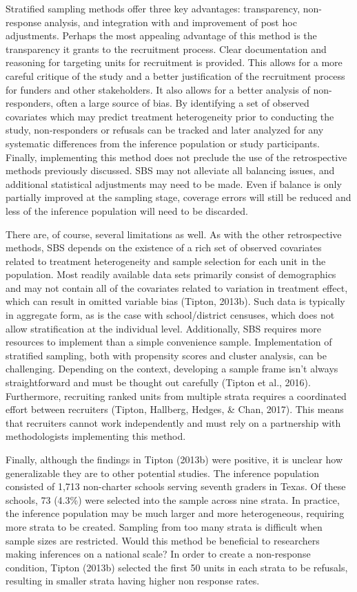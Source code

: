 \documentclass[man,floatsintext]{apa6}
\begin{document}
Stratified sampling methods offer three key advantages: transparency, non-response analysis, and integration with and improvement of post hoc adjustments. Perhaps the most appealing advantage of this method is the transparency it grants to the recruitment process. Clear documentation and reasoning for targeting units for recruitment is provided. This allows for a more careful critique of the study and a better justification of the recruitment process for funders and other stakeholders. It also allows for a better analysis of non-responders, often a large source of bias. By identifying a set of observed covariates which may predict treatment heterogeneity prior to conducting the study, non-responders or refusals can be tracked and later analyzed for any systematic differences from the inference population or study participants. Finally, implementing this method does not preclude the use of the retrospective methods previously discussed. SBS may not alleviate all balancing issues, and additional statistical adjustments may need to be made. Even if balance is only partially improved at the sampling stage, coverage errors will still be reduced and less of the inference population will need to be discarded.

There are, of course, several limitations as well. As with the other retrospective methods, SBS depends on the existence of a rich set of observed covariates related to treatment heterogeneity and sample selection for each unit in the population. Most readily available data sets primarily consist of demographics and may not contain all of the covariates related to variation in treatment effect, which can result in omitted variable bias (Tipton, 2013b). Such data is typically in aggregate form, as is the case with school/district censuses, which does not allow stratification at the individual level. Additionally, SBS requires more resources to implement than a simple convenience sample. Implementation of stratified sampling, both with propensity scores and cluster analysis, can be challenging. Depending on the context, developing a sample frame isn't always straightforward and must be thought out carefully (Tipton et al., 2016). Furthermore, recruiting ranked units from multiple strata requires a coordinated effort between recruiters (Tipton, Hallberg, Hedges, \& Chan, 2017). This means that recruiters cannot work independently and must rely on a partnership with methodologists implementing this method.

Finally, although the findings in Tipton (2013b) were positive, it is unclear how generalizable they are to other potential studies. The inference population consisted of 1,713 non-charter schools serving seventh graders in Texas. Of these schools, 73 (4.3\%) were selected into the sample across nine strata. In practice, the inference population may be much larger and more heterogeneous, requiring more strata to be created. Sampling from too many strata is difficult when sample sizes are restricted. Would this method be beneficial to researchers making inferences on a national scale? In order to create a non-response condition, Tipton (2013b) selected the first 50 units in each strata to be refusals, resulting in smaller strata having higher non response rates.
\end{document}
